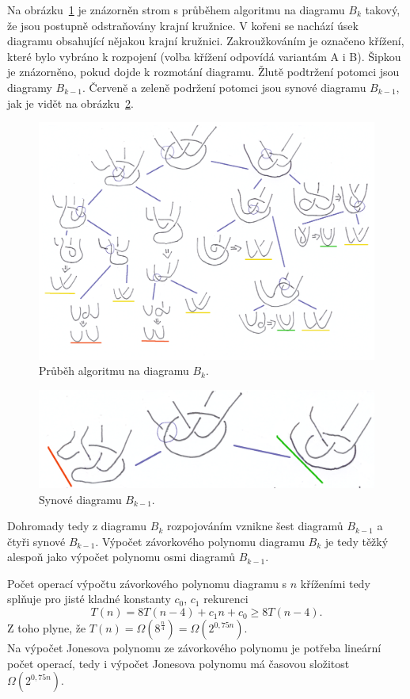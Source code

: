 \begin{dukaz}
Na obrázku~\ref{prubehhorni} je znázorněn strom s průběhem algoritmu na diagramu $B_k$ takový, že jsou postupně odstraňovány krajní kružnice. V kořeni se nachází úsek diagramu obsahující nějakou krajní kružnici. Zakroužkováním je označeno křížení, které bylo vybráno k rozpojení (volba křížení odpovídá variantám A i B). Šipkou je znázorněno, pokud dojde k rozmotání diagramu. Žlutě podtržení potomci jsou diagramy $B_{k-1}$. Červeně a zeleně podržení potomci jsou synové diagramu $B_{k-1}$, jak je vidět na obrázku~\ref{rozdvojeni}.


\begin{figure}[h] \centering
\includegraphics[scale=0.43]{../img/horniodhad}
\caption{Průběh algoritmu na diagramu $B_k$.} \label{prubehhorni}
\end{figure}

\begin{figure}[h] \centering
\includegraphics[scale=0.28]{../img/rozdvojeni}
\caption{Synové diagramu $B_{k-1}$.}  \label{rozdvojeni}
\end{figure}

Dohromady tedy z diagramu $B_k$ rozpojováním vznikne šest diagramů $B_{k-1}$ a čtyři synové $B_{k-1}$. Výpočet závorkového polynomu diagramu $B_k$ je tedy těžký alespoň jako výpočet polynomu osmi diagramů $B_{k-1}$. 

Počet operací výpočtu závorkového polynomu diagramu s $n$ kříženími tedy splňuje pro jisté kladné konstanty $c_0$, $c_1$ rekurenci
$$ T(n) = 8T(n-4) + c_1 n + c_0 \geq 8T(n-4). $$
Z toho plyne, že $T(n) = \Omega\left(8^{\frac{n}{4}}\right)  =  \Omega\left(2^{0,75 n}\right)$. \\

Na výpočet Jonesova polynomu ze závorkového polynomu je potřeba lineární počet operací, tedy i výpočet Jonesova polynomu má časovou složitost $\Omega\left(2^{0,75n}\right)$.
\end{dukaz}
